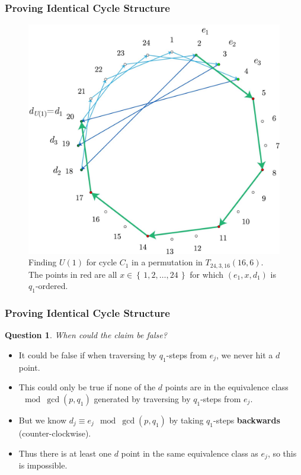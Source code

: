 \documentclass{beamer}
\theoremstyle{plain}
\newtheorem{question}[theorem]{Question}
\theoremstyle{definition}
\theoremstyle{remark}
\renewcommand{\'}{\hspace{0.5mm}'}		%
\renewcommand{\Set}[1]{\left\{\,#1\,\right\}}	%
\begin{document}
\begin{frame}
\frametitle{Proving Identical Cycle Structure}

	\begin{figure}
		\includegraphics[scale=0.15]{circ_24_U.jpg}
		\caption{Finding $U(1)$ for cycle $C_1$ 
		in a permutation in $T_{24,3,16}(16,6)$. 
		The points in red are all $x \in \Set{1,2,
		\hdots, 24}$ for which $(e_1,x,d_1)$ is $q_1$-ordered. }
	\end{figure}

\end{frame}


\begin{frame}
\frametitle{Proving Identical Cycle Structure}

	\begin{question}
		When could the claim be false?
	\end{question}
	
	\begin{itemize}
		\item It could be false if when traversing by
		$q_1$-steps from $e_j$, we never hit a $d$ point. 
		\item This could only be true if none of the $d$
		points are in the equivalence class $\mod \gcd(p,q_1)$
		generated by traversing by $q_1$-steps from $e_j$. 
		\item But we know $d_j \equiv e_j \mod \gcd(p,q_1)$
		by taking $q_1$-steps \textbf{backwards} 
		(counter-clockwise). 
		\item Thus there is at least one $d$ point in the 
		same equivalence class as $e_j$, so this is impossible. 
	\end{itemize}

\end{frame}
\end{document}
